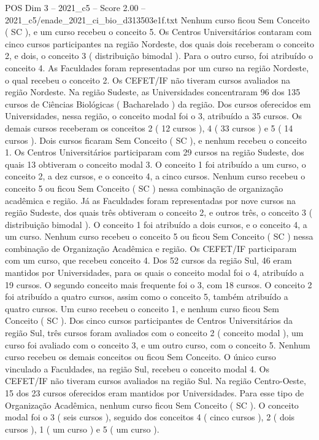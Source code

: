 \begin{textsample}{POS Dim 3 – 2021\_c5 – Score 2.00 – 2021\_c5/enade\_2021\_ci\_bio\_d313503e1f.txt}
Nenhum curso ficou Sem Conceito ( SC ), e um curso recebeu o conceito 5.
Os Centros Universitários contaram com cinco cursos participantes na região Nordeste, dos quais dois receberam o conceito 2, e dois, o conceito 3 ( distribuição bimodal ).
Para o outro curso, foi atribuído o conceito 4.
As Faculdades foram representadas por um curso na região Nordeste, o qual recebeu o conceito 2.
Os CEFET/IF não tiveram cursos avaliados na região Nordeste.
Na região Sudeste, as Universidades concentraram 96 dos 135 cursos de Ciências Biológicas ( Bacharelado ) da região.
Dos cursos oferecidos em Universidades, nessa região, o conceito modal foi o 3, atribuído a 35 cursos.
Os demais cursos receberam os conceitos 2 ( 12 cursos ), 4 ( 33 cursos ) e 5 ( 14 cursos ).
Dois cursos ficaram Sem Conceito ( SC ), e nenhum recebeu o conceito 1.
Os Centros Universitários participaram com 29 cursos na região Sudeste, dos quais 13 obtiveram o conceito modal 3.
O conceito 1 foi atribuído a um curso, o conceito 2, a dez cursos, e o conceito 4, a cinco cursos.
Nenhum curso recebeu o conceito 5 ou ficou Sem Conceito ( SC ) nessa combinação de organização acadêmica e região.
Já as Faculdades foram representadas por nove cursos na região Sudeste, dos quais três obtiveram o conceito 2, e outros três, o conceito 3 ( distribuição bimodal ).
O conceito 1 foi atribuído a dois cursos, e o conceito 4, a um curso.
Nenhum curso recebeu o conceito 5 ou ficou Sem Conceito ( SC ) nessa combinação de Organização Acadêmica e região.
Os CEFET/IF participaram com um curso, que recebeu conceito 4.
Dos 52 cursos da região Sul, 46 eram mantidos por Universidades, para os quais o conceito modal foi o 4, atribuído a 19 cursos.
O segundo conceito mais frequente foi o 3, com 18 cursos.
O conceito 2 foi atribuído a quatro cursos, assim como o conceito 5, também atribuído a quatro cursos.
Um curso recebeu o conceito 1, e nenhum curso ficou Sem Conceito ( SC ).
Dos cinco cursos participantes de Centros Universitários da região Sul, três cursos foram avaliados com o conceito 2 ( conceito modal ), um curso foi avaliado com o conceito 3, e um outro curso, com o conceito 5.
Nenhum curso recebeu os demais conceitos ou ficou Sem Conceito.
O único curso vinculado a Faculdades, na região Sul, recebeu o conceito modal 4.
Os CEFET/IF não tiveram cursos avaliados na região Sul.
Na região Centro-Oeste, 15 dos 23 cursos oferecidos eram mantidos por Universidades.
Para esse tipo de Organização Acadêmica, nenhum curso ficou Sem Conceito ( SC ).
O conceito modal foi o 3 ( seis cursos ), seguido dos conceitos 4 ( cinco cursos ), 2 ( dois cursos ), 1 ( um curso ) e 5 ( um curso ).

\end{textsample}
